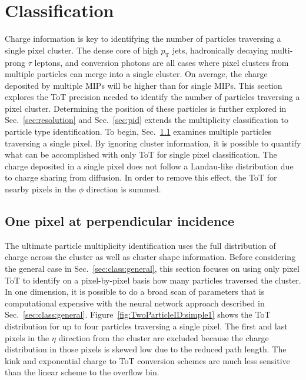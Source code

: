 \documentclass[12pt]{article}
\begin{document}
\clearpage

\section{Classification}
\label{sec:classification}

Charge information is key to identifying the number of particles traversing a single pixel cluster.  The dense core of high $p_\text{T}$ jets, hadronically decaying multi-prong $\tau$ leptons, and conversion photons are all cases where pixel clusters from multiple particles can merge into a single cluster.  On average, the charge deposited by multiple MIPs will be higher than for single MIPs.  This section explores the ToT precision needed to identify the number of particles traversing a pixel cluster.  Determining the position of these particles is further explored in Sec.~\ref{sec:resolution} and Sec.~\ref{sec:pid} extends the multiplicity classification to particle type identification.  To begin, Sec.~\ref{sec:class:onepix} examines multiple particles traversing a single pixel.  By ignoring cluster information, it is possible to quantify what can be accomplished with only ToT for single pixel classification.  The charge deposited in a single pixel does not follow a Landau-like distribution due to charge sharing from diffusion.  In order to remove this effect, the ToT for nearby pixels in the $\phi$ direction is summed.  %

\subsection{One pixel at perpendicular incidence}
\label{sec:class:onepix}


The ultimate particle multiplicity identification uses the full distribution of charge across the cluster as well as cluster shape information.  Before considering the general case in Sec.~\ref{sec:class:general}, this section focuses on using only pixel ToT to identify on a pixel-by-pixel basis how many particles traversed the cluster.  In one dimension, it is possible to do a broad scan of parameters that is computational expensive with the neural network approach described in Sec.~\ref{sec:class:general}.  Figure~\ref{fig:TwoParticleID:simple1} shows the ToT distribution for up to four particles traversing a single pixel.  The first and last pixels in the $\eta$ direction from the cluster are excluded because the charge distribution in those pixels is skewed low due to the reduced path length.  The kink and exponential charge to ToT conversion schemes are much less sensitive than the linear scheme to the overflow bin.
\end{document}
